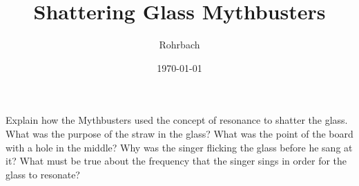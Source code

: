 \documentclass[10pt]{exam}
\title{Shattering Glass Mythbusters}
\author{Rohrbach}
\date{\today}
\begin{document}
\maketitle

\begin{questions}
  \question
    Explain how the Mythbusters used the concept of resonance to shatter the glass. \vs
  \question
    What was the purpose of the straw in the glass? \vs
  \question
    What was the point of the board with a hole in the middle? \vs
  \question
    Why was the singer flicking the glass before he sang at it? \vs
  \question
    What must be true about the frequency that the singer sings in order for the glass to resonate? \vs

\end{questions}
\end{document}
